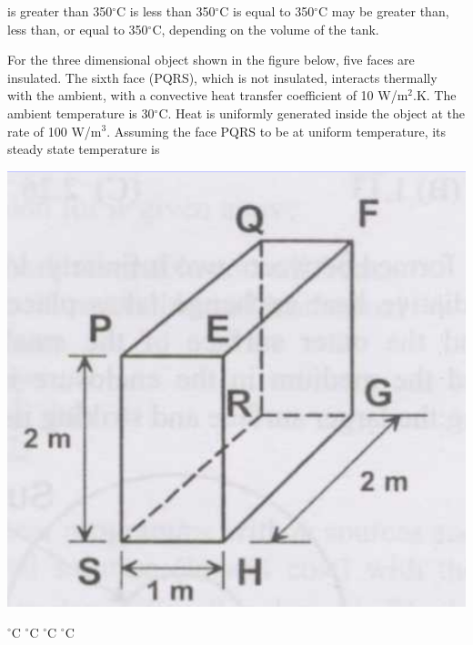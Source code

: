 \documentclass[addpoints,11pt]{exam}
\begin{document}
\begin{questions}
        \begin{choices}
            \choice is greater than 350$^\circ$C
            \choice is less than 350$^\circ$C
            \choice is equal to 350$^\circ$C
            \choice may be greater than, less than, or equal to 350$^\circ$C, depending on the volume of the tank.
        \end{choices}

        \question For the three dimensional object shown in the figure below, five faces are insulated. The sixth face (PQRS), which is not insulated, interacts thermally with the ambient, with a convective heat transfer coefficient of 10 W/m$^2$.K. The ambient temperature is 30$^\circ$C. Heat is uniformly generated inside the object at the rate of 100 W/m$^3$. Assuming the face PQRS to be at uniform temperature, its steady state temperature is
        
        \begin{center}
            \includegraphics[scale=0.3]{q50}
        \end{center}

        \begin{oneparchoices}
            $^\circ$C
            $^\circ$C
            $^\circ$C
            $^\circ$C
        \end{oneparchoices}\\


\end{questions}
\end{document}
